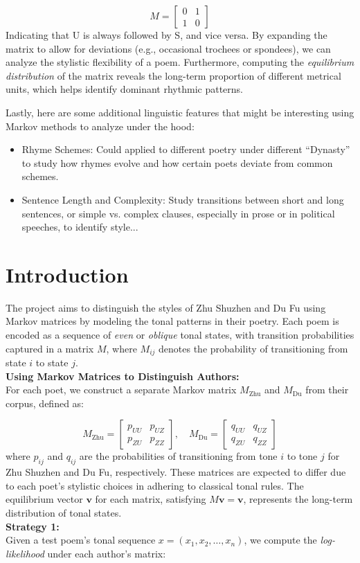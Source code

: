 \documentclass[12pt]{article}
\begin{document}
\[
    M = \begin{bmatrix} 0 & 1 \\ 1 & 0 \end{bmatrix}
\]
Indicating that U is always followed by S, and vice versa. By expanding the matrix to allow for deviations (e.g., occasional trochees or spondees), we can analyze the stylistic flexibility of a poem.
Furthermore, computing the \textit{equilibrium distribution} of the matrix reveals the long-term proportion of different metrical units, which helps identify dominant rhythmic patterns.

Lastly, here are some additional linguistic features that might be interesting using Markov methods to analyze under the hood:
\begin{itemize}
    \item Rhyme Schemes: Could applied to different poetry under different ``Dynasty'' to study how rhymes evolve and how certain poets deviate from common schemes.
    \item Sentence Length and Complexity: Study transitions between short and long sentences, or simple vs. complex clauses, especially in prose or in political speeches, to identify style...
\end{itemize}

\section{Introduction}
The project aims to distinguish the styles of Zhu Shuzhen and Du Fu using Markov matrices by modeling the tonal patterns in their poetry. Each poem is encoded as a sequence of \textit{even} or \textit{oblique} tonal states, with transition probabilities captured in a matrix $M$, where $M_{ij}$ denotes the probability of transitioning from state $i$ to state $j$.
\\
\textbf{Using Markov Matrices to Distinguish Authors: }
\\
For each poet, we construct a separate Markov matrix $M_{\text{Zhu}}$ and $M_{\text{Du}}$ from their corpus, defined as:

\[
    M_{\text{Zhu}} = \begin{bmatrix} p_{UU} & p_{UZ} \\ p_{ZU} & p_{ZZ} \end{bmatrix}, \quad M_{\text{Du}} = \begin{bmatrix} q_{UU} & q_{UZ} \\ q_{ZU} & q_{ZZ} \end{bmatrix}
\]
where $p_{ij}$ and $q_{ij}$ are the probabilities of transitioning from tone $i$ to tone $j$ for Zhu Shuzhen and Du Fu, respectively. These matrices are expected to differ due to each poet's stylistic choices in adhering to classical tonal rules. The equilibrium vector $\mathbf{v}$ for each matrix, satisfying $M \mathbf{v} = \mathbf{v}$, represents the long-term distribution of tonal states.
\\
\textbf{Strategy 1: }
\\
Given a test poem's tonal sequence $x = (x_1, x_2, \ldots, x_n)$, we compute the \textit{log-likelihood} under each author's matrix:
\end{document}
